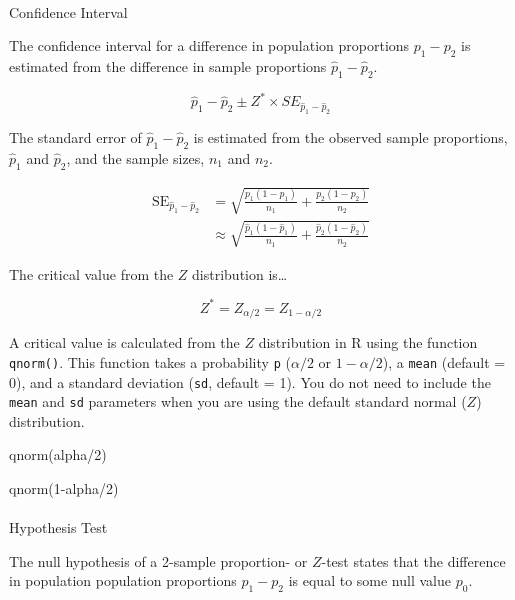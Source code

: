\documentclass[
  letterpaper,
  DIV=11,
  numbers=noendperiod]{scrartcl}
\makeatletter
\let\oldparagraph\paragraph
\renewcommand{\paragraph}{
    \@ifstar
      \xxxParagraphStar
      \xxxParagraphNoStar
  }
\newcommand{\xxxParagraphStar}[1]{\oldparagraph*{#1}\mbox{}}
\newcommand{\xxxParagraphNoStar}[1]{\oldparagraph{#1}\mbox{}}
\newenvironment{Shaded}{\begin{snugshade}}{\end{snugshade}}
\newcommand{\DecValTok}[1]{\textcolor[rgb]{0.68,0.00,0.00}{#1}}
\newcommand{\FunctionTok}[1]{\textcolor[rgb]{0.28,0.35,0.67}{#1}}
\newcommand{\NormalTok}[1]{\textcolor[rgb]{0.00,0.23,0.31}{#1}}
\newcommand{\SpecialCharTok}[1]{\textcolor[rgb]{0.37,0.37,0.37}{#1}}
\makeatother
\begin{document}
\paragraph{Confidence Interval}\label{confidence-interval-4}

The confidence interval for a difference in population proportions
\(p_1-p_2\) is estimated from the difference in sample proportions
\(\hat{p}_1-\hat{p}_2\).

\[
\hat{p}_1-\hat{p}_2 \pm Z^* \times SE_{\hat{p}_1-\hat{p}_2}
\]

The standard error of \(\hat{p}_1-\hat{p}_2\) is estimated from the
observed sample proportions, \(\hat{p}_1\) and \(\hat{p}_2\), and the
sample sizes, \(n_1\) and \(n_2\).

\[
\begin{aligned}
\operatorname{SE}_{\hat{p}_1-\hat{p}_2}&=\sqrt{\frac{p_1(1-p_1)}{n_1} + \frac{p_2(1-p_2)}{n_2}} \\
&\approx \sqrt{\frac{\hat{p}_1(1-\hat{p}_1)}{n_1}+\frac{\hat{p}_2(1-\hat{p}_2)}{n_2}}
\end{aligned}
\]

The critical value from the \(Z\) distribution is\ldots{}

\[
Z^*=Z_{\alpha/2}=Z_{1-\alpha/2}
\]

A critical value is calculated from the \(Z\) distribution in R using
the function \texttt{qnorm()}. This function takes a probability
\texttt{p} (\(\alpha/2\) or \(1-\alpha/2\)), a \texttt{mean} (default =
0), and a standard deviation (\texttt{sd}, default = 1). You do not need
to include the \texttt{mean} and \texttt{sd} parameters when you are
using the default standard normal (\(Z\)) distribution.

\begin{Shaded}
\begin{Highlighting}[]
\FunctionTok{qnorm}\NormalTok{(alpha}\SpecialCharTok{/}\DecValTok{2}\NormalTok{)}

\FunctionTok{qnorm}\NormalTok{(}\DecValTok{1}\SpecialCharTok{{-}}\NormalTok{alpha}\SpecialCharTok{/}\DecValTok{2}\NormalTok{)}
\end{Highlighting}
\end{Shaded}

\paragraph{Hypothesis Test}\label{hypothesis-test-4}

The null hypothesis of a 2-sample proportion- or \(Z\)-test states that
the difference in population population proportions \(p_1-p_2\) is equal
to some null value \(p_0\).
\end{document}
